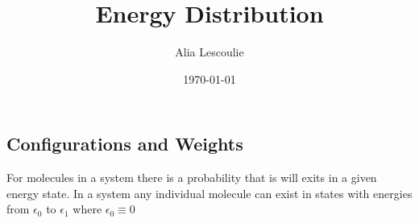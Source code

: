 \documentclass[a4paper, 12 pt]{article}
\author{Alia Lescoulie}
\title{\vspace{-1.5cm}Energy Distribution}
\date{\today}
\begin{document}
\maketitle
\begin{flushleft}
\section{Configurations and Weights}

For molecules in a system there is a probability that is will exits in a given energy state. In a system any individual molecule can exist in states with energies from $\epsilon_0$ to $\epsilon_1$ where $\epsilon_0 \equiv 0$ 

\end{flushleft}
\end{document}
